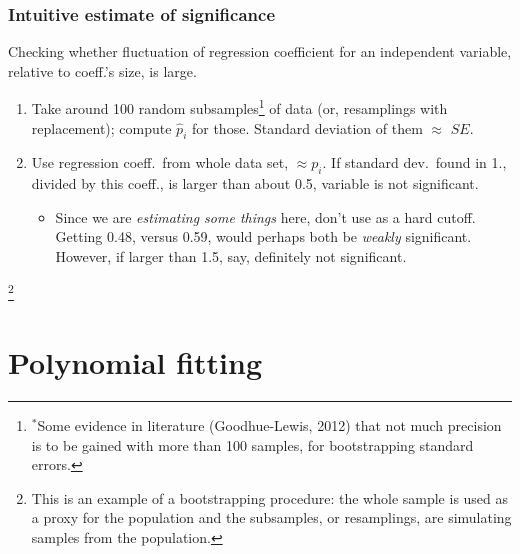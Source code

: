 \documentclass{beamer}
\theoremstyle{example}
\begin{document}
\begin{frame}
    \frametitle{Intuitive estimate of significance}
    Checking whether fluctuation of regression coefficient for an independent variable, relative to coeff.'s size, is large.

    \begin{enumerate}
        \pause
        \item Take around 100 random subsamples\footnote{$^\ast$Some evidence in literature (Goodhue-Lewis, 2012) that not much precision is to be gained with more than 100 samples, for bootstrapping standard errors.} of data (or, resamplings with replacement); compute $\hat{p}_i$ for those. Standard deviation of them $\approx$ $SE$.
        \pause
        \item Use regression coeff.\ from whole data set, $\approx p_i$. If standard dev.\ found in {\color{strings}1.}, divided by this coeff., is larger than about 0.5, variable is not significant.
        \begin{itemize}
            \item Since we are \emph{estimating some things} here, don't use as a hard cutoff. Getting 0.48, versus 0.59, would perhaps both be \emph{weakly} significant. However, if larger than 1.5, say, definitely not significant.
        \end{itemize}
    \end{enumerate}
    
    \footnote{This is an example of a bootstrapping procedure: the whole sample is used as a proxy for the population and the subsamples, or resamplings, are simulating samples from the population.}
\end{frame}

\section{Polynomial fitting}
\end{document}
